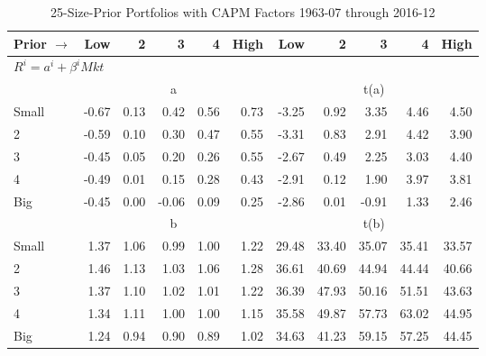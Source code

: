 
\begin{table}[!ht]
\centering
\caption{25-Size-Prior Portfolios with CAPM Factors 1963-07 through 2016-12}
\begin{tabular}{lrrrrrrrrrr}
  \toprule
    Prior $\rightarrow$ & Low & 2 & 3 & 4 & High & Low & 2 & 3 & 4 & High \\ 
  \midrule
  \multicolumn{11}{l}{$R^i=a^i+\beta^iMkt$} \\

  
    
      & \multicolumn{5}{c}{a} & \multicolumn{5}{c}{t(a)}
    
    \\
      \cmidrule(r){2-6} \cmidrule(r){7-11}

    Small   & -0.67  & 0.13  & 0.42  & 0.56  & 0.73  & -3.25  & 0.92  & 3.35  & 4.46  & 4.50  \\
         2  & -0.59  & 0.10  & 0.30  & 0.47  & 0.55  & -3.31  & 0.83  & 2.91  & 4.42  & 3.90  \\
         3  & -0.45  & 0.05  & 0.20  & 0.26  & 0.55  & -2.67  & 0.49  & 2.25  & 3.03  & 4.40  \\
         4  & -0.49  & 0.01  & 0.15  & 0.28  & 0.43  & -2.91  & 0.12  & 1.90  & 3.97  & 3.81  \\
    Big     & -0.45  & 0.00  & -0.06  & 0.09  & 0.25  & -2.86  & 0.01  & -0.91  & 1.33  & 2.46  \\

  
    
      & \multicolumn{5}{c}{b} & \multicolumn{5}{c}{t(b)}
    
    \\
      \cmidrule(r){2-6} \cmidrule(r){7-11}

    Small   & 1.37  & 1.06  & 0.99  & 1.00  & 1.22  & 29.48  & 33.40  & 35.07  & 35.41  & 33.57  \\
         2  & 1.46  & 1.13  & 1.03  & 1.06  & 1.28  & 36.61  & 40.69  & 44.94  & 44.44  & 40.66  \\
         3  & 1.37  & 1.10  & 1.02  & 1.01  & 1.22  & 36.39  & 47.93  & 50.16  & 51.51  & 43.63  \\
         4  & 1.34  & 1.11  & 1.00  & 1.00  & 1.15  & 35.58  & 49.87  & 57.73  & 63.02  & 44.95  \\
    Big     & 1.24  & 0.94  & 0.90  & 0.89  & 1.02  & 34.63  & 41.23  & 59.15  & 57.25  & 44.45  \\

  

  \bottomrule
\end{tabular}
\label{tbl:25_Size_Prior_CAPM}
\end{table}
